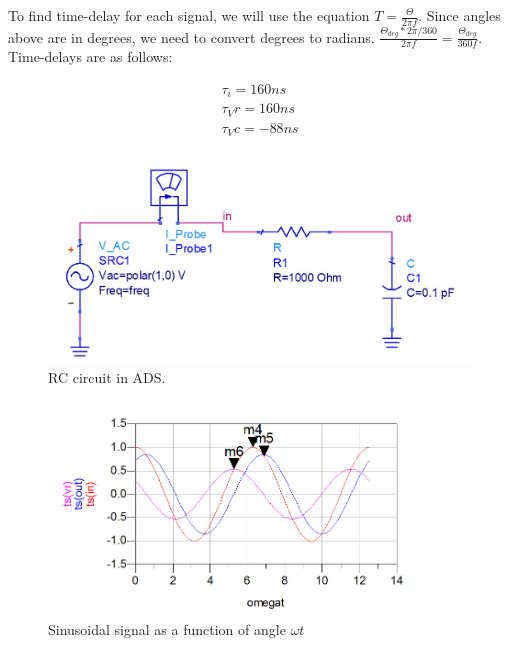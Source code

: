 \documentclass{ximera}
\begin{document}
\begin{example}
\begin{explanation}
 To find time-delay for each signal, we will use the equation $T=\frac{\Theta}{2 \pi f}$.  Since angles above are in degrees, we need to convert degrees to radians. $\frac{\Theta_{deg}*2 \pi /360}{2 \pi f}=\frac{ \Theta_{deg}}{360 f}  $. Time-delays are as follows:
 
 \begin{eqnarray}
 \tau_i= 160 \unit{ns} \\
 \tau_Vr= 160 \unit{ns} \\
 \tau_Vc=- 88 \unit{ns}  
 \end{eqnarray}
 
 
 


\begin{figure}[htbp]
\begin{center}
\includegraphics[scale=0.2]{../jpg/RCcircADS.jpg}
\end{center}
\caption{\label{RCcircADS} RC circuit in ADS.}
\end{figure}


\begin{figure}[htbp]
\begin{center}
\includegraphics[scale=0.3]{../jpg/voltagesinRCcircRadADS}
\end{center}
\caption{\label{SSangle} Sinusoidal signal as a function of angle $\omega t$}
\end{figure}



\end{explanation}
\end{example}
\end{document}

